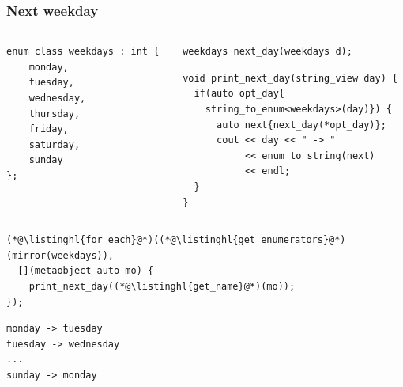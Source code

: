 \documentclass[compress,table,xcolor=table]{beamer}
\begin{document}
\begin{frame}[fragile]
  \frametitle{Next weekday}
  \begin{columns}
    \begin{column}{.46\textwidth}
      \begin{lstlisting}[language=c++2x,basicstyle=\scriptsize\ttfamily]
enum class weekdays : int {
    monday,
    tuesday,
    wednesday,
    thursday,
    friday,
    saturday,
    sunday
};
      \end{lstlisting}
    \end{column}
    \begin{column}{.54\textwidth}
      \begin{lstlisting}[language=c++2x,basicstyle=\scriptsize\ttfamily]
weekdays next_day(weekdays d);
      \end{lstlisting}
      \begin{lstlisting}[language=c++2x,basicstyle=\tiny\ttfamily]
void print_next_day(string_view day) {
  if(auto opt_day{
    string_to_enum<weekdays>(day)}) {
      auto next{next_day(*opt_day)};
      cout << day << " -> "
           << enum_to_string(next)
           << endl;
  }
}
      \end{lstlisting}
    \end{column}
  \end{columns}
  \begin{lstlisting}[language=c++2x,basicstyle=\scriptsize\ttfamily]
(*@\listinghl{for_each}@*)((*@\listinghl{get_enumerators}@*)(mirror(weekdays)),
  [](metaobject auto mo) {
    print_next_day((*@\listinghl{get_name}@*)(mo));
});
  \end{lstlisting}
  \smaller
  \begin{verbatim}
monday -> tuesday
tuesday -> wednesday
...
sunday -> monday
  \end{verbatim}
\end{frame}
\end{document}
